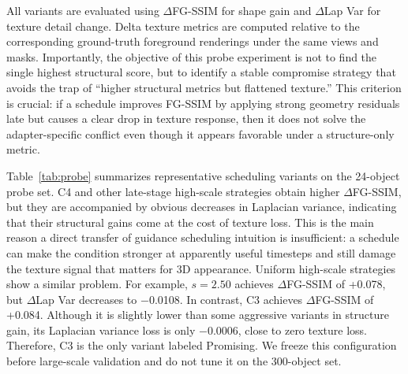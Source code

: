 \documentclass[times,twocolumn,final]{elsarticle}
\begin{document}
All variants are evaluated using $\Delta$FG-SSIM for shape gain and $\Delta$Lap Var for texture detail change. Delta texture metrics are computed relative to the corresponding ground-truth foreground renderings under the same views and masks. Importantly, the objective of this probe experiment is not to find the single highest structural score, but to identify a stable compromise strategy that avoids the trap of ``higher structural metrics but flattened texture.'' This criterion is crucial: if a schedule improves FG-SSIM by applying strong geometry residuals late but causes a clear drop in texture response, then it does not solve the adapter-specific conflict even though it appears favorable under a structure-only metric.

\begin{table}[t]
\centering
\caption{Shape-texture trade-off on the 24-object probe set. Delta texture metrics are computed relative to the corresponding ground-truth foreground renderings under the same views and masks; $\Delta$Lap Var closer to 0 indicates smaller texture loss.}
\label{tab:probe}
\end{table}

Table~\ref{tab:probe} summarizes representative scheduling variants on the 24-object probe set. C4 and other late-stage high-scale strategies obtain higher $\Delta$FG-SSIM, but they are accompanied by obvious decreases in Laplacian variance, indicating that their structural gains come at the cost of texture loss. This is the main reason a direct transfer of guidance scheduling intuition is insufficient: a schedule can make the condition stronger at apparently useful timesteps and still damage the texture signal that matters for 3D appearance. Uniform high-scale strategies show a similar problem. For example, $s = 2.50$ achieves $\Delta$FG-SSIM of +0.078, but $\Delta$Lap Var decreases to $-$0.0108. In contrast, C3 achieves $\Delta$FG-SSIM of +0.084. Although it is slightly lower than some aggressive variants in structure gain, its Laplacian variance loss is only $-$0.0006, close to zero texture loss. Therefore, C3 is the only variant labeled Promising. We freeze this configuration before large-scale validation and do not tune it on the 300-object set.
\end{document}
